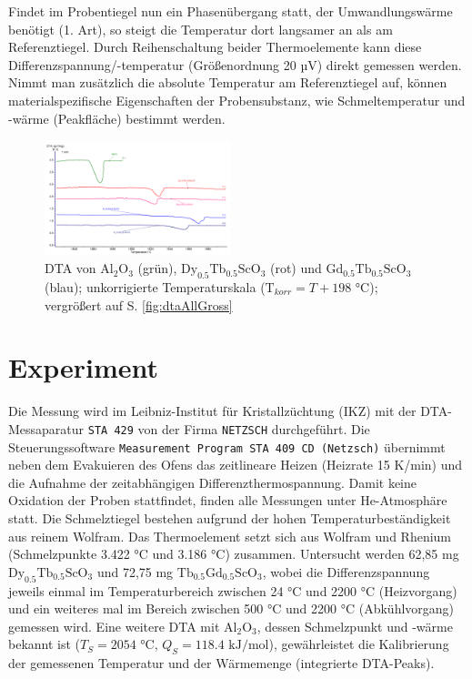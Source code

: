 \documentclass[aps,twocolumn,secnumarabic,nobalancelastpage,amsmath,amssymb,
nofootinbib,superscriptaddress]{revtex4-1}
\begin{document}
Findet im Probentiegel nun ein Phasenübergang statt, der Umwandlungswärme benötigt (1. Art), so steigt die Temperatur dort langsamer an als am Referenztiegel. Durch Reihenschaltung beider
Thermoelemente kann diese Differenzspannung/-temperatur (Größenordnung 20 $\text{µV}$) direkt gemessen werden. Nimmt man zusätzlich die absolute Temperatur am Referenztiegel auf, können materialspezifische Eigenschaften
der Probensubstanz, wie Schmeltemperatur und -wärme (Peakfläche) bestimmt werden.



\begin{figure}[t]
  \centering
   \includegraphics[width=0.48\textwidth]{../img/Messkurven_unsere.png}
  \caption{\label{fig:dtaDyTb+TbGd} DTA von $\text{Al}_{2}\text{O}_3$ (grün), $\text{Dy}_{0.5}\text{Tb}_{0.5}\text{ScO}_3$ (rot)
  und $\text{Gd}_{0.5}\text{Tb}_{0.5}\text{ScO}_3$ (blau); unkorrigierte Temperaturskala ($\text{T}_{korr}=T + 198\text{ °C}$); vergrößert auf S. \ref{fig:dtaAllGross}}
\end{figure}

\section{Experiment}
\noindent Die Messung wird im Leibniz-Institut für Kristallzüchtung (IKZ) mit der DTA-Messaparatur \texttt{STA 429} von der Firma \texttt{NETZSCH} durchgeführt. Die Steuerungssoftware
\texttt{Measurement Program STA 409 CD (Netzsch)} übernimmt neben dem Evakuieren des Ofens das zeitlineare Heizen (Heizrate 15 K/min) und die Aufnahme der zeitabhängigen Differenzthermospannung.
Damit keine Oxidation der Proben stattfindet, finden alle Messungen unter He-Atmosphäre statt. Die Schmelztiegel bestehen aufgrund der hohen
Temperaturbeständigkeit aus reinem Wolfram. Das Thermoelement setzt sich aus Wolfram und Rhenium (Schmelzpunkte 3.422 °C und 3.186 °C) zusammen.
Untersucht werden 62,85 mg $\text{Dy}_{0.5}\text{Tb}_{0.5}\text{ScO}_3$ und 72,75 mg $\text{Tb}_{0.5}\text{Gd}_{0.5}\text{ScO}_3$, wobei die Differenzspannung jeweils
einmal im Temperaturbereich zwischen 24 °C und 2200 °C (Heizvorgang) und ein weiteres mal im Bereich zwischen 500 °C und 2200 °C (Abkühlvorgang) gemessen wird. Eine weitere DTA
mit $\text{Al}_2\text{O}_3$, dessen Schmelzpunkt und -wärme bekannt ist ($T_S=2054\text{ °C}$, $Q_S=118.4\text{ kJ/mol}$), gewährleistet die Kalibrierung der gemessenen Temperatur
und der Wärmemenge (integrierte DTA-Peaks).
\end{document}
